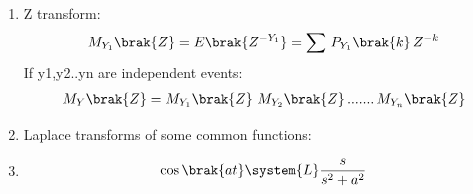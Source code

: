 \begin{enumerate}[label=\thesubsection.\arabic*,ref=\thesubsection.\theenumi]
\item
Z transform:\label{eq:ztransform}\\
\begin{align}
	M_{Y_1}\brak{Z}=E\brak{Z^{-Y_1}}=\sum\, P_{Y_1}\brak{k}\,Z^{-k}\label{eq:ztransformdef}
\end{align}
If y1,y2..yn are independent events:
\begin{align}
M_Y\brak{Z}=M_{Y_1}\brak{Z}\,\, M_{Y_2}\brak{Z}\,.......\,M_{Y_n}\brak{Z}\label{eq:ztransformindep}
\end{align}

\item
Laplace transforms of some common functions:\label{eq:laplacecommon}

\item
\begin{align}
\cos\brak{at}\system{L}\frac{s}{s^2+a^2}\label{eq:laplacecos}
\end{align}


\end{enumerate}
